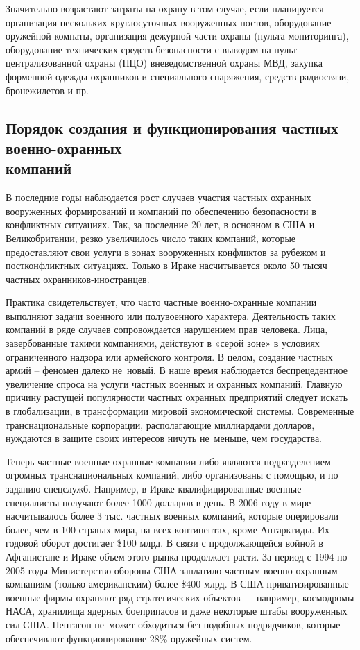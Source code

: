 \documentclass[a4paper,12pt,fleqn]{article} %
\begin{document}
Значительно возрастают затраты на охрану в том случае, если планируется организация нескольких круглосуточных вооруженных постов, оборудование оружейной комнаты, организация дежурной части охраны (пульта мониторинга), оборудование технических средств безопасности с выводом на пульт централизованной охраны (ПЦО) вневедомственной охраны МВД, закупка форменной одежды охранников и специального снаряжения, средств радиосвязи, бронежилетов и пр.

\subsection{Порядок создания и функционирования частных военно-охранных \\компаний}

В последние годы наблюдается рост случаев участия частных охранных вооруженных формирований и компаний по обеспечению безопасности в конфликтных ситуациях. Так, за последние 20 лет, в основном в США и Великобритании, резко увеличилось число таких компаний, которые предоставляют свои услуги в зонах вооруженных конфликтов за рубежом и постконфликтных ситуациях. Только в Ираке насчитывается около 50 тысяч частных охранников-иностранцев.
	
Практика свидетельствует, что часто частные военно-охранные компании выполняют задачи военного или полувоенного характера. Деятельность таких компаний в ряде случаев сопровождается нарушением прав человека. Лица, завербованные такими компаниями, действуют в «серой зоне» в условиях ограниченного надзора или армейского контроля. В целом, создание частных армий – феномен далеко не~новый. В наше время наблюдается беспрецедентное увеличение спроса на услуги частных военных и охранных компаний. Главную причину растущей популярности частных охранных предприятий следует искать в глобализации, в трансформации мировой экономической системы. Современные транснациональные корпорации, располагающие миллиардами долларов, нуждаются в защите своих интересов ничуть не~меньше, чем государства.  

Теперь частные военные охранные компании либо являются подразделением огромных транснациональных компаний, либо организованы с помощью, и по заданию спецслужб. Например, в Ираке квалифицированные военные специалисты получают более 1000 долларов в день. В 2006 году в мире насчитывалось более 3 тыс. частных военных компаний, которые оперировали более, чем в 100 странах мира, на всех континентах, кроме Антарктиды. Их годовой оборот достигает \$100 млрд. В связи с продолжающейся войной в Афганистане и Ираке объем этого рынка продолжает расти. За период с 1994 по 2005 годы Министерство обороны США заплатило частным военно-охранным компаниям (только американским) более \$400 млрд. В США приватизированные военные фирмы охраняют ряд стратегических объектов --- например, космодромы НАСА, хранилища ядерных боеприпасов и даже некоторые штабы вооруженных сил США. Пентагон не~может обходиться без подобных подрядчиков, которые обеспечивают функционирование 28\% оружейных систем. 
\end{document}
